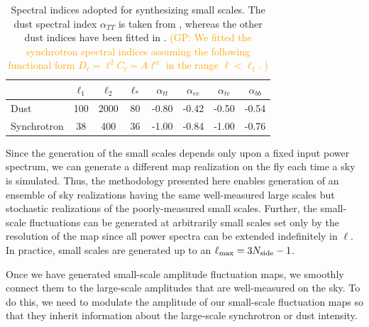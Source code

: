 \documentclass[twocolumn]{aastex631}
\newcommand{\giuse}[1]{\textcolor{orange}{(GP: #1)}}
\begin{document}
\begin{table}[]
    \centering
    \footnotesize
    \begin{tabular}{lccccccc}
    \toprule 
   &   $ \ell_1  $&$\ell_2$   &$\ell_* $& $\alpha_{tt}$  & $\alpha_{ee}$ &$\alpha_{te}$ &$\alpha_{bb}$ \\
   \midrule  
   Dust & 100 & 2000 & 80 & -0.80 & -0.42& -0.50 & -0.54 \\ 
   Synchrotron & 38 & 400 & 36 & -1.00& -0.84 & -1.00 & -0.76 \\
   \bottomrule
    \end{tabular}
    \caption{Spectral indices adopted for synthesizing  small scales. The dust spectral index $\alpha_{TT}$ is taken from \citet{Miville-Deschenes:2016}, whereas the other dust  indices have been fitted in \citet{planck2016-l11A}. \giuse{We fitted the synchrotron spectral indices  assuming the following functional form $D_{\ell}= \ell^2 C_{\ell } = A \ell^{\alpha}$ in the range $\ell<\ell_1$. }}
    \label{tab:smallscale_par}
\end{table}

Since the generation of the small scales depends only upon a fixed input power spectrum, we can generate a different map realization on the fly each time a sky is simulated. Thus, the methodology presented here enables generation of an ensemble of sky realizations having the same well-measured large scales but stochastic realizations of the poorly-measured small scales. Further, the small-scale fluctuations can be generated at arbitrarily small scales set only by the resolution of the map since all power spectra can be extended indefinitely in $\ell$. In practice, small scales are generated up to an $\ell_{\rm max} = 3N_{\rm side}-1$.


Once we have generated small-scale amplitude fluctuation maps, we smoothly connect them to the large-scale amplitudes that are well-measured on the sky. To do this, we need to modulate the amplitude of our small-scale fluctuation maps so that they inherit information about the large-scale synchrotron or dust intensity.
\end{document}
